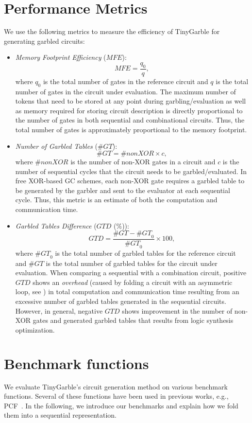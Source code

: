 \section{Performance Metrics}
We use the following metrics to measure the efficiency of TinyGarble for generating garbled circuits:

\begin{itemize}
\item
	\textit{Memory Footprint Efficiency} ($\mathit{MFE}$): $$\mathit{MFE} = \dfrac{q_{0}}{q},$$ where $q_{0}$ is the total number of gates in the reference circuit and $q$ is the total number of gates in the circuit under evaluation.
	The maximum number of tokens that need to be stored at any point during garbling/evaluation as well as memory required for storing circuit description is directly proportional to the number of gates in both sequential and combinational circuits.
	Thus, the total number of gates is approximately proportional to the memory footprint.

\item
	\textit{Number of Garbled Tables} ($\mathit{\#GT}$): $$\mathit{\#GT} = \#nonXOR\times c,$$ where $\#nonXOR$ is the number of non-XOR gates in a circuit and $c$ is the number of sequential cycles that the circuit needs to be garbled/evaluated.
	In free XOR-based GC schemes, each non-XOR gate requires a garbled table to be generated by the garbler and sent to the evaluator at each sequential cycle.
	Thus, this metric is an estimate of both the computation and communication time.

\item
	\textit{Garbled Tables Difference} ($\mathit{GTD}$ (\%)): $$\mathit{GTD} = \dfrac{\mathit{\#GT} - \mathit{\#GT}_{0}}{\mathit{\#GT}_{0}} \times 100,$$ where $\mathit{\#GT}_{0}$ is the total number of garbled tables for the reference circuit and $\mathit{\#GT}$ is the total number of garbled tables for the circuit under evaluation.
	When comparing a sequential with a combination circuit, positive $\mathit{GTD}$ shows an \emph{overhead} (caused by folding a circuit with an asymmetric loop, see ) in total computation and communication time resulting from an excessive number of garbled tables generated in the sequential circuits.
	However, in general, negative $\mathit{GTD}$ shows improvement in the number of non-XOR gates and generated garbled tables that results from logic synthesis optimization.
\end{itemize}

\section{Benchmark functions}
We evaluate TinyGarble's circuit generation method on various benchmark functions.
Several of these functions have been used in previous works, e.g., PCF~\cite{kreuter2013pcf}.
In the following, we introduce our benchmarks and explain how we fold them into a sequential representation.

